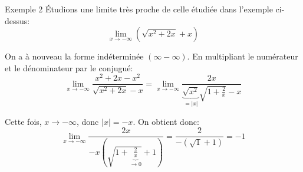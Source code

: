 \documentclass[a4paper]{article}
\begin{document}
\begin{parag}{Exemple 2}
    Étudions une limite très proche de celle étudiée dans l'exemple ci-dessus:
    \[\lim_{x \to -\infty} \left(\sqrt{x^2 + 2x} + x\right)\]

    On a à nouveau la forme indéterminée $\left(\infty - \infty\right)$. En multipliant le numérateur et le dénominateur par le conjugué:
    \[\lim_{x \to -\infty} \frac{x^2 + 2x - x^2}{\sqrt{x^2 + 2x} - x} = \lim_{x \to -\infty} \frac{2x}{\underbrace{\sqrt{x^2}}_{= \left|x\right|} \sqrt{1 + \frac{2}{x}} - x}\]

    Cette fois, $x \to -\infty$, donc $\left|x\right| = -x$. On obtient donc:
    \[\lim_{x \to -\infty} \frac{2x}{-x\left(\sqrt{1 + \underbrace{\frac{2}{x}}_{\to 0}} + 1\right)} = \frac{2}{-\left(\sqrt{1} + 1\right)} = -1\]


\end{parag}
\end{document}
